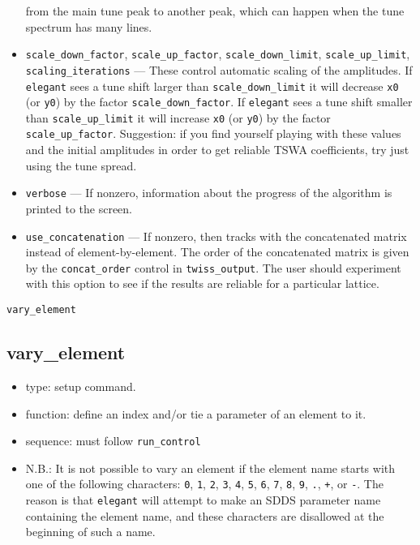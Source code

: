 \documentclass[11pt]{article}
\begin{document}
\begin{itemize}
        from the main tune peak to another peak, which can happen when the tune spectrum
        has many lines.
\item \verb|scale_down_factor|, \verb|scale_up_factor|, \verb|scale_down_limit|, 
        \verb|scale_up_limit|, \verb|scaling_iterations| --- These control automatic scaling
        of the amplitudes.  If {\tt elegant} sees a tune shift larger than \verb|scale_down_limit|
        it will decrease \verb|x0| (or \verb|y0|) by the factor \verb|scale_down_factor|. 
        If  {\tt elegant} sees a tune shift smaller than \verb|scale_up_limit|
        it will increase \verb|x0| (or \verb|y0|) by the factor \verb|scale_up_factor|. 
        Suggestion: if you find yourself playing with these values and the initial amplitudes
        in order to get reliable TSWA coefficients, try just using the tune spread.
\item \verb|verbose| --- If nonzero, information about the progress of the algorithm is 
        printed to the screen.
\item \verb|use_concatenation| --- If nonzero, then tracks with the concatenated matrix instead
        of element-by-element.  The order
        of the concatenated matrix is given by the \verb|concat_order| control in
        \verb|twiss_output|. The user should experiment with this option to see if the
        results are reliable for a particular lattice.
\end{itemize}

\newpage
\begin{center}{\Large\verb|vary_element|}\end{center}
\subsection{vary\_element \label{subsec:varyelement}}

\begin{itemize}
\item type: setup command.
\item function: define an index and/or tie a parameter of an element to it.
\item sequence: must follow \verb|run_control|
\item N.B.: It is not possible to vary an element if the element name starts with one of the following
characters: 
\verb|0|, \verb|1|, \verb|2|, \verb|3|, \verb|4|, \verb|5|, \verb|6|, \verb|7|, \verb|8|,
\verb|9|, \verb|.|, \verb|+|, or \verb|-|.  The reason is that {\tt elegant} will attempt to 
make an SDDS parameter name containing the element name, and these characters are disallowed
at the beginning of such a name.
\end{itemize}
\end{document}
